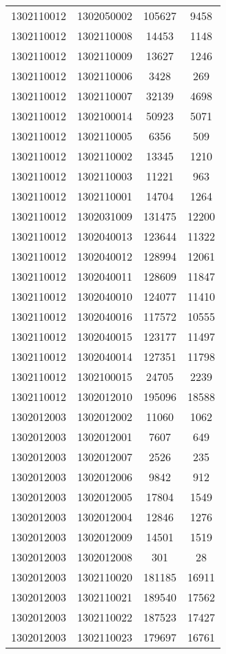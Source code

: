 \begin{longtable}[h]{llcc}
		1302110012 & 1302050002 & 105627 & 9458\\
		1302110012 & 1302110008 & 14453 & 1148\\
		1302110012 & 1302110009 & 13627 & 1246\\
		1302110012 & 1302110006 & 3428 & 269\\
		1302110012 & 1302110007 & 32139 & 4698\\
		1302110012 & 1302100014 & 50923 & 5071\\
		1302110012 & 1302110005 & 6356 & 509\\
		1302110012 & 1302110002 & 13345 & 1210\\
		1302110012 & 1302110003 & 11221 & 963\\
		1302110012 & 1302110001 & 14704 & 1264\\
		1302110012 & 1302031009 & 131475 & 12200\\
		1302110012 & 1302040013 & 123644 & 11322\\
		1302110012 & 1302040012 & 128994 & 12061\\
		1302110012 & 1302040011 & 128609 & 11847\\
		1302110012 & 1302040010 & 124077 & 11410\\
		1302110012 & 1302040016 & 117572 & 10555\\
		1302110012 & 1302040015 & 123177 & 11497\\
		1302110012 & 1302040014 & 127351 & 11798\\
		1302110012 & 1302100015 & 24705 & 2239\\
		1302110012 & 1302012010 & 195096 & 18588\\
		1302012003 & 1302012002 & 11060 & 1062\\
		1302012003 & 1302012001 & 7607 & 649\\
		1302012003 & 1302012007 & 2526 & 235\\
		1302012003 & 1302012006 & 9842 & 912\\
		1302012003 & 1302012005 & 17804 & 1549\\
		1302012003 & 1302012004 & 12846 & 1276\\
		1302012003 & 1302012009 & 14501 & 1519\\
		1302012003 & 1302012008 & 301 & 28\\
		1302012003 & 1302110020 & 181185 & 16911\\
		1302012003 & 1302110021 & 189540 & 17562\\
		1302012003 & 1302110022 & 187523 & 17427\\
		1302012003 & 1302110023 & 179697 & 16761\\

\end{longtable}
